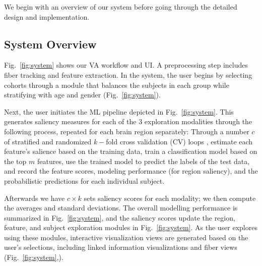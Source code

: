 \noindent We begin with an overview of our system before going through the detailed design and implementation.


\subsection{System Overview}
\label{sec:systemoverview}


\noindent Fig.~\ref{fig:system} shows our VA workflow and UI. A preprocessing step includes fiber tracking and feature extraction. In the system, the user begins by selecting cohorts through a module that balances the subjects in each group while stratifying with age and gender (Fig.~\ref{fig:system}). 

Next, the user initiates the ML pipeline depicted in Fig.~\ref{fig:system}. This generates saliency measures for each of the 3 exploration modalities through the following process, repeated for each brain region separately: Through a number $c$ of stratified and randomized $k-$fold cross validation (CV) loops 
, estimate each feature's salience based on the training data,  train a classification model based on the top $m$ features, use the trained model to predict the labels of the test data, and record the feature scores, modeling performance (for region saliency), and the probabilistic predictions for each individual subject. 

Afterwards we have $c\times k$ sets saliency scores for each modality; we then compute the averages and standard deviations. The overall modelling performance is summarized in Fig.~\ref{fig:system}, and the saliency scores update the region, feature, and subject exploration modules in Fig.~\ref{fig:system}. As the user explores using these modules, interactive visualization views are generated based on the user's selections, including linked information visualizations and fiber views (Fig.~\ref{fig:system},). 

